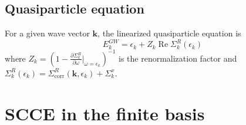 \subsection{Quasiparticle equation}
For a given wave vector $\bm{k}$, the linearized quasiparticle equation is
\begin{equation}
    E^{GW}_k = \epsilon_k + Z_k \operatorname{Re} \Sigma_k^R(\epsilon_k)
\end{equation}
where $Z_k = \left(1 - \frac{\partial \Sigma_k^R}{\partial \omega} \big|_{\omega = \epsilon_k}\right)^{-1}$ is the renormalization factor and $\Sigma_k^R(\epsilon_k)= \Sigma^R_{\text{corr}}(\bm{k},\epsilon_k) + \Sigma_k^x$.

\section{SCCE in the finite basis}

